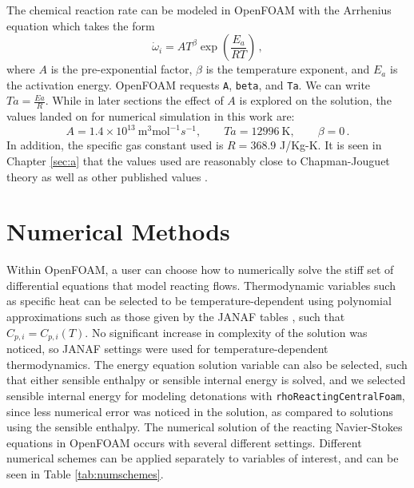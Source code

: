 The chemical reaction rate can be modeled in OpenFOAM with the Arrhenius equation \cite{arrhenius} which takes the form \cite{christ} 
\begin{equation}
\dot{\omega}_i = AT^\beta \exp\left(\frac{E_a}{R T}\right)\,,
\end{equation}
where $A$ is the pre-exponential factor, $\beta$ is the temperature exponent, and $E_a$ is the activation energy. OpenFOAM requests \verb|A|, \verb|beta|, and \verb|Ta|. We can write \(Ta = \frac{Ea}{R }\). While in later sections the effect of \(A\) is explored on the solution, the values landed on for numerical simulation in this work are:
\begin{equation}
   A = 1.4 \times 10^{13} ~ \text{m}^3\text{mol}^{-1}s^{-1},
   \qquad 
   Ta = 12996 ~\text{K},
   \qquad
   \beta = 0\,.
\end{equation}
\noindent In addition, the specific gas constant used is \(R = 368.9\) J/Kg-K. It is seen in Chapter \ref{sec:a} that the values used are reasonably close to Chapman-Jouguet theory as well as other published values \cite{towery1}\cite{hashemi}. 

\section{Numerical Methods}
Within OpenFOAM, a user can choose how to numerically solve the stiff set of differential equations that model reacting flows. Thermodynamic variables such as specific heat can be selected to be temperature-dependent using polynomial approximations such as those given by the JANAF tables \cite{janaf}, such that \(C_{p,i} = C_{p,i}(T)\). No significant increase in complexity of the solution was noticed, so JANAF settings were used for temperature-dependent thermodynamics. The energy equation solution variable can also be selected, such that either sensible enthalpy or sensible internal energy is solved, and we selected sensible internal energy for modeling detonations with \verb|rhoReactingCentralFoam|, since less numerical error was noticed in the solution, as compared to solutions using the sensible enthalpy. The numerical solution of the reacting Navier-Stokes equations in OpenFOAM occurs with several different settings. Different numerical schemes can be applied separately to variables of interest, and can be seen in Table \ref{tab:numschemes}. 

